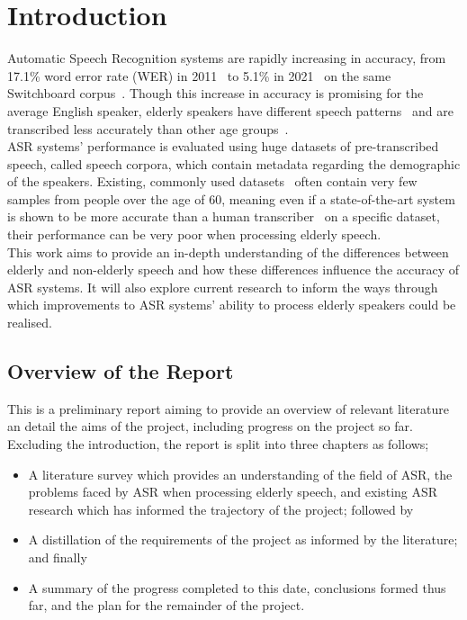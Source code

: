 \chapter{Introduction}\label{ch:introduction}

Automatic Speech Recognition systems are rapidly increasing in accuracy, from 17.1\% word error
rate (WER) in 2011~\cite{seide2011} to 5.1\% in 2021~\cite{Ng2021} on the same Switchboard
corpus~\cite{switchboard}.
Though this increase in accuracy is promising for the average English speaker, elderly speakers
have different speech patterns~\cite{Horton2010} and are transcribed less accurately than other age
groups~\cite{picone1990}.\\

ASR systems' performance is evaluated using huge datasets of pre-transcribed speech, called
speech corpora, which contain metadata regarding the demographic of the speakers.
Existing, commonly used datasets~\cite{librispeech, switchboard} often contain very few samples
from people over the age of 60, meaning even if a state-of-the-art system is shown to be more
accurate than a human transcriber~\cite{chung2021} on a specific dataset, their performance can
be very poor when processing elderly speech.\\

This work aims to provide an in-depth understanding of the differences between elderly and
non-elderly speech and how these differences influence the accuracy of ASR systems.
It will also explore current research to inform the ways through which improvements to ASR systems'
ability to process elderly speakers could be realised.

\section{Overview of the Report}\label{sec:overview-of-the-report}

This is a preliminary report aiming to provide an overview of relevant literature an detail the
aims of the project, including progress on the project so far.
Excluding the introduction, the report is split into three chapters as follows;

\begin{itemize}
    \item A literature survey which provides an understanding of the field of ASR, the problems
    faced by ASR when processing elderly speech, and existing ASR research which has informed the
    trajectory of the project;
    followed by
    \item A distillation of the requirements of the project as informed by the literature;
    and finally
    \item A summary of the progress completed to this date, conclusions formed thus far, and the
    plan for the remainder of the project.
\end{itemize}